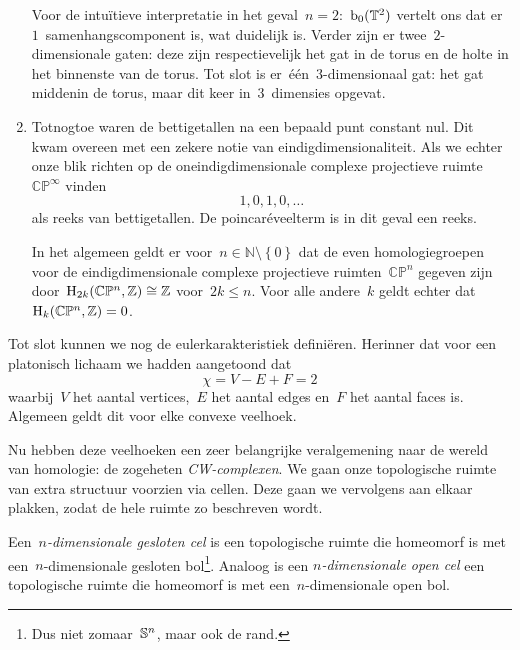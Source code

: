 \documentclass[a4paper,11pt,openany,oneside,article]{memoir}
\begin{document}
\begin{example}
\begin{enumerate}
      Voor de intu\"itieve interpretatie in het geval~$n=2$:~$\mathrm{b}_0(\mathbb{T}^2)$ vertelt ons dat er~$1$~samenhangscomponent is, wat duidelijk is. Verder zijn er twee~$2$\nobreakdash-dimensionale gaten: deze zijn respectievelijk het gat in de torus en de holte in het binnenste van de torus. Tot slot is er~\'e\'en~$3$\nobreakdash-dimensionaal gat: het gat middenin de torus, maar dit keer in~$3$~dimensies opgevat.
      
    \item Totnogtoe waren de bettigetallen na een bepaald punt constant nul. Dit kwam overeen met een zekere notie van eindigdimensionaliteit. Als we echter onze blik richten op de oneindigdimensionale complexe projectieve ruimte~$\mathbb{C}\mathbb{P}^{\infty}$ vinden
      \begin{equation}
        1,0,1,0,\ldots
      \end{equation}
      als reeks van bettigetallen. De poincar\'eveelterm is in dit geval een reeks.

      In het algemeen geldt er voor~$n\in\mathbb{N}\setminus\left\{ 0 \right\}$ dat de even homologiegroepen voor de eindigdimensionale complexe projectieve ruimten~$\mathbb{C}\mathbb{P}^n$ gegeven zijn door~$\mathrm{H}_{2k}(\mathbb{C}\mathbb{P}^n,\mathbb{Z})\cong\mathbb{Z}$ voor~$2k\leq n$. Voor alle andere~$k$ geldt echter dat~$\mathrm{H}_{k}(\mathbb{C}\mathbb{P}^n,\mathbb{Z})=0$.
  \end{enumerate}
\end{example}

Tot slot kunnen we nog de eulerkarakteristiek defini\"eren. Herinner dat voor een platonisch lichaam we hadden aangetoond dat
\begin{equation}
  \chi=V-E+F=2
\end{equation}
waarbij~$V$ het aantal vertices,~$E$ het aantal edges en~$F$ het aantal faces is. Algemeen geldt dit voor elke convexe veelhoek.

Nu hebben deze veelhoeken een zeer belangrijke veralgemening naar de wereld van homologie: de zogeheten \emph{CW\nobreakdash-complexen}. We gaan onze topologische ruimte van extra structuur voorzien via cellen. Deze gaan we vervolgens aan elkaar plakken, zodat de hele ruimte zo beschreven wordt.

\begin{definition}
  Een~\emph{$n$-dimensionale gesloten cel} is een topologische ruimte die homeomorf is met een~$n$-dimensionale gesloten bol\footnote{Dus niet zomaar~$\mathbb{S}^n$, maar ook de rand.}. Analoog is een \emph{$n$\nobreakdash-dimensionale open cel} een topologische ruimte die homeomorf is met een~$n$-dimensionale open bol.
\end{definition}
\end{document}
